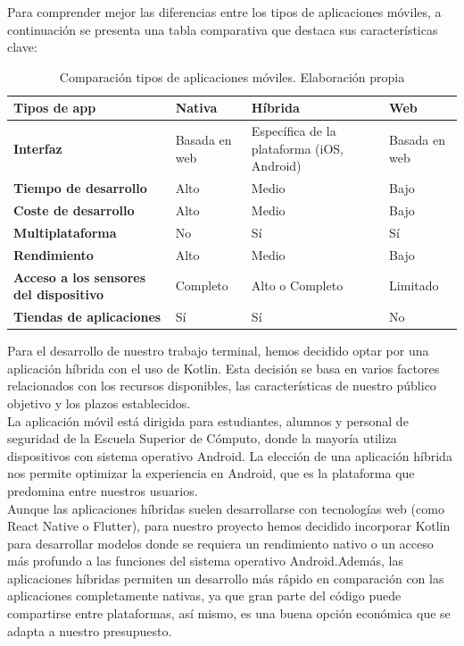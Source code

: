 Para comprender mejor las diferencias entre los tipos de aplicaciones móviles, a continuación se presenta una tabla comparativa que destaca sus características clave:
\newpage

\begin{table}[h!]
	\centering
	\begin{tabular}{|p{4cm}|p{2cm}|p{2cm}|p{2cm}|}
		\hline
		\textbf{Tipos de app} & \textbf{Nativa} & \textbf{Híbrida} & \textbf{Web} \\ \hline
		\textbf{Interfaz} & Basada en web & Específica de la plataforma (iOS, Android) & Basada en web \\ \hline
		\textbf{Tiempo de desarrollo} & Alto & Medio & Bajo \\ \hline
		\textbf{Coste de desarrollo} & Alto & Medio & Bajo \\ \hline
		\textbf{Multiplataforma} & No & Sí & Sí \\ \hline
		\textbf{Rendimiento} & Alto & Medio & Bajo \\ \hline
		\textbf{Acceso a los sensores del dispositivo} & Completo & Alto o Completo & Limitado \\ \hline
		\textbf{Tiendas de aplicaciones} & Sí & Sí & No \\ \hline
	\end{tabular}
	\caption{Comparación tipos de aplicaciones móviles. Elaboración propia}
	\label{tab:tipos_apps}
\end{table}

Para el desarrollo de nuestro trabajo terminal, hemos decidido optar por una aplicación híbrida con el uso de Kotlin. Esta decisión se basa en varios factores relacionados con los recursos disponibles, las características de nuestro público objetivo y los plazos establecidos. \\

La aplicación móvil está dirigida para estudiantes, alumnos y personal de seguridad de la Escuela Superior de Cómputo, donde la mayoría utiliza dispositivos con sistema operativo Android. La elección de una aplicación híbrida nos permite optimizar  la experiencia en Android, que es la plataforma que predomina entre nuestros usuarios. \\

Aunque las aplicaciones híbridas suelen desarrollarse con tecnologías web (como React Native o Flutter), para nuestro proyecto hemos decidido incorporar Kotlin para desarrollar modelos donde se requiera un rendimiento nativo o un acceso más profundo a las funciones del sistema operativo Android.Además, las aplicaciones híbridas permiten un desarrollo más rápido en comparación con las aplicaciones completamente nativas, ya que gran parte del código puede compartirse entre plataformas, así mismo, es una buena opción económica que se adapta a nuestro presupuesto. 

